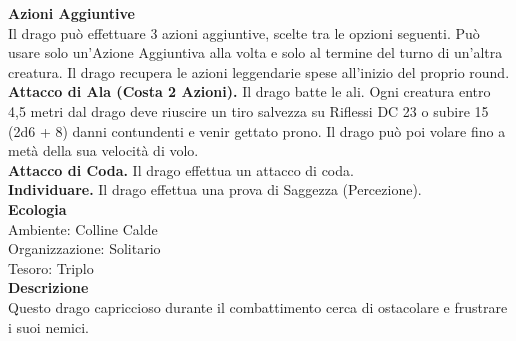 \begin{multicols}{2}
\textbf{Azioni Aggiuntive}\\
Il drago può effettuare 3 azioni aggiuntive, scelte tra le opzioni seguenti. Può usare solo un'Azione Aggiuntiva alla volta e solo al termine del turno di un'altra creatura. Il drago recupera le azioni leggendarie spese all'inizio del proprio round.\\
\textbf{Attacco di Ala (Costa 2 Azioni).} Il drago batte le ali. Ogni creatura entro 4,5 metri dal drago deve riuscire un tiro salvezza su Riflessi DC 23 o subire 15 (2d6 + 8) danni contundenti e venir gettato prono. Il drago può poi volare fino a metà della sua velocità di volo.\\
\textbf{Attacco di Coda.} Il drago effettua un attacco di coda.\\
\textbf{Individuare.} Il drago effettua una prova di Saggezza (Percezione).\\
\textbf{Ecologia}\\
Ambiente: Colline Calde\\
Organizzazione: Solitario\\
Tesoro: Triplo\\
\textbf{Descrizione}\\
Questo drago capriccioso durante il combattimento cerca di ostacolare e frustrare i suoi nemici.\\


\end{multicols}
